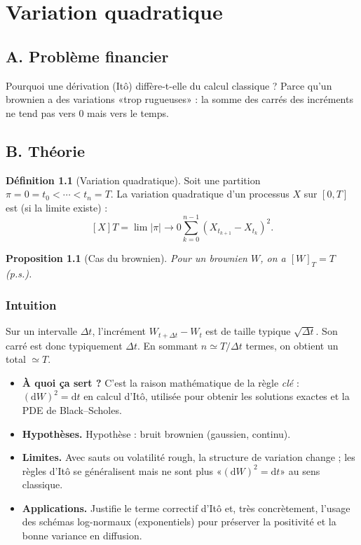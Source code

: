\documentclass[11pt,a4paper]{report}
\theoremstyle{definition}
\newtheorem{definition}{Définition}[chapter]
\theoremstyle{plain}
\newtheorem{proposition}{Proposition}[chapter]
\theoremstyle{remark}
\newcommand{\dd}{\mathrm{d}}
\newcommand{\1}{\mathbf{1}}
\newcommand{\qa}[4]{
\begin{itemize}[leftmargin=*]
\item \textbf{À quoi ça sert ?} #1
\item \textbf{Hypothèses.} #2
\item \textbf{Limites.} #3
\item \textbf{Applications.} #4
\end{itemize}
}
\begin{document}
\chapter{Variation quadratique}

\section{A. Problème financier}
Pourquoi une dérivation (Itô) diffère-t-elle du calcul classique ? Parce qu'un brownien a des variations «trop rugueuses» : la somme des carrés des incréments ne tend pas vers 0 mais vers le temps.

\section{B. Théorie}
\begin{definition}[Variation quadratique]
Soit une partition $\pi={0=t_0<\cdots<t_n=T}$. La variation quadratique d'un processus $X$ sur $[0,T]$ est (si la limite existe) :
\[
[X]T=\lim{|\pi|\to 0}\sum_{k=0}^{n-1}(X_{t_{k+1}}-X_{t_k})^2.
\]
\end{definition}

\begin{proposition}[Cas du brownien]
Pour un brownien $W$, on a $[W]_T=T$ (p.s.).
\end{proposition}

\subsection*{Intuition}
Sur un intervalle $\Delta t$, l'incrément $W_{t+\Delta t}-W_t$ est de taille typique $\sqrt{\Delta t}$. Son carré est donc typiquement $\Delta t$. En sommant $n\simeq T/\Delta t$ termes, on obtient un total $\simeq T$.

\qa
{C'est la raison mathématique de la règle \emph{clé} : $(\dd W)^2=\dd t$ en calcul d'Itô, utilisée pour obtenir les solutions exactes et la PDE de Black--Scholes.}
{Hypothèse : bruit brownien (gaussien, continu).}
{Avec sauts ou volatilité rough, la structure de variation change ; les règles d'Itô se généralisent mais ne sont plus «$(\dd W)^2=\dd t$» au sens classique.}
{Justifie le terme correctif d'Itô et, très concrètement, l'usage des schémas log-normaux (exponentiels) pour préserver la positivité et la bonne variance en diffusion.}
\end{document}
